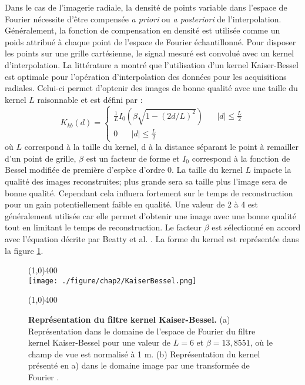 Dans le cas de l'imagerie radiale, la densité de points variable dans l'espace de Fourier nécessite d'être compensée \textit{a priori} ou \textit{a posteriori} de l'interpolation. Généralement, la fonction de compensation en densité est utilisée comme un poids attribué à chaque point de l'espace de Fourier échantillonné. Pour disposer les points sur une grille cartésienne, le signal mesuré est convolué avec un kernel d'interpolation. La littérature a montré que l'utilisation d'un kernel Kaiser-Bessel est optimale pour l'opération d'interpolation des données pour les acquisitions radiales. Celui-ci permet d'optenir des images de bonne qualité avec une taille du kernel $L$ raisonnable et est défini par :
\begin{equation}
  K_{kb}(d) = \left\{
      \begin{aligned}
         \frac{1}{L}I_0(\beta \sqrt{1-(2d/L)^2}) \;\;\;\;\;\;  |d| \leq \frac{L}{2}\\
	     0 \;\;\;\;\;\; |d| \leq \frac{L}{2}
      \end{aligned}
    \right.
\end{equation}
où $L$ correspond à la taille du kernel, d à la distance séparant le point à remailler d'un point de grille, $\beta$ est un facteur de forme et $I_0$ correspond à la fonction de Bessel modifiée de première d'espèce d'ordre 0.
La taille du kernel $L$ impacte la qualité des images reconstruites; plus grande sera sa taille plus l'image sera de bonne qualité. Cependant cela influera fortement sur le temps de reconstruction pour un gain potentiellement faible en qualité. Une valeur de 2 à 4 est généralement utilisée car elle permet d'obtenir une image avec une bonne qualité tout en limitant le temps de reconstruction. Le facteur $\beta$ est sélectionné en accord avec l'équation décrite par Beatty et al. \cite{Beatty:2005fk}. La forme du kernel est représentée dans la figure \ref{fig:KaiserBessel}.
\begin{figure}[H]
\centering
\line(1,0){400} \\
\texttt{[image: ./figure/chap2/KaiserBessel.png]}
\caption[Représentation du filtre kernel Kaiser-Bessel.]{\label{fig:KaiserBessel} \textbf{Représentation du filtre kernel Kaiser-Bessel.} (a) Représentation dans le domaine de l'espace de Fourier du filtre kernel Kaiser-Bessel pour une valeur de $L = 6$ et $\beta = 13,8551$, où le champ de vue est normalisé à 1 m. (b) Représentation du kernel présenté en a) dans le domaine image par une transformée de Fourier .}
\line(1,0){400} \\
\end{figure}

